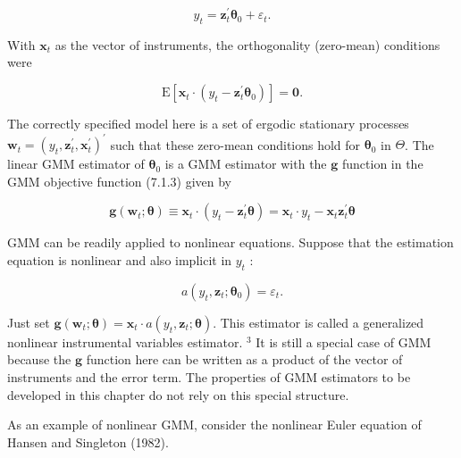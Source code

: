 \documentclass[10pt]{article}
\begin{document}
\begin{equation*}
y_{t}=\mathbf{z}_{t}^{\prime} \boldsymbol{\theta}_{0}+\varepsilon_{t} . \tag{7.1.21}
\end{equation*}


With $\mathbf{x}_{t}$ as the vector of instruments, the orthogonality (zero-mean) conditions were


\begin{equation*}
\mathrm{E}\left[\mathbf{x}_{t} \cdot\left(y_{t}-\mathbf{z}_{t}^{\prime} \boldsymbol{\theta}_{0}\right)\right]=\mathbf{0} . \tag{7.1.22}
\end{equation*}


The correctly specified model here is a set of ergodic stationary processes $\mathbf{w}_{t}= \left(y_{t}, \mathbf{z}_{t}^{\prime}, \mathbf{x}_{t}^{\prime}\right)^{\prime}$ such that these zero-mean conditions hold for $\boldsymbol{\theta}_{0}$ in $\Theta$. The linear GMM estimator of $\boldsymbol{\theta}_{0}$ is a GMM estimator with the $\mathbf{g}$ function in the GMM objective function (7.1.3) given by


\begin{equation*}
\mathbf{g}\left(\mathbf{w}_{t} ; \boldsymbol{\theta}\right) \equiv \mathbf{x}_{t} \cdot\left(y_{t}-\mathbf{z}_{t}^{\prime} \boldsymbol{\theta}\right)=\mathbf{x}_{t} \cdot y_{t}-\mathbf{x}_{t} \mathbf{z}_{t}^{\prime} \boldsymbol{\theta} \tag{7.1.23}
\end{equation*}


GMM can be readily applied to nonlinear equations. Suppose that the estimation equation is nonlinear and also implicit in $y_{t}$ :


\begin{equation*}
a\left(y_{t}, \mathbf{z}_{t} ; \boldsymbol{\theta}_{0}\right)=\varepsilon_{t} . \tag{7.1.24}
\end{equation*}


Just set $\mathbf{g}\left(\mathbf{w}_{t} ; \boldsymbol{\theta}\right)=\mathbf{x}_{t} \cdot a\left(y_{t}, \mathbf{z}_{t} ; \boldsymbol{\theta}\right)$. This estimator is called a generalized nonlinear instrumental variables estimator. ${ }^{3}$ It is still a special case of GMM because the $\mathbf{g}$ function here can be written as a product of the vector of instruments and the error term. The properties of GMM estimators to be developed in this chapter do not rely on this special structure.

As an example of nonlinear GMM, consider the nonlinear Euler equation of Hansen and Singleton (1982).
\end{document}
